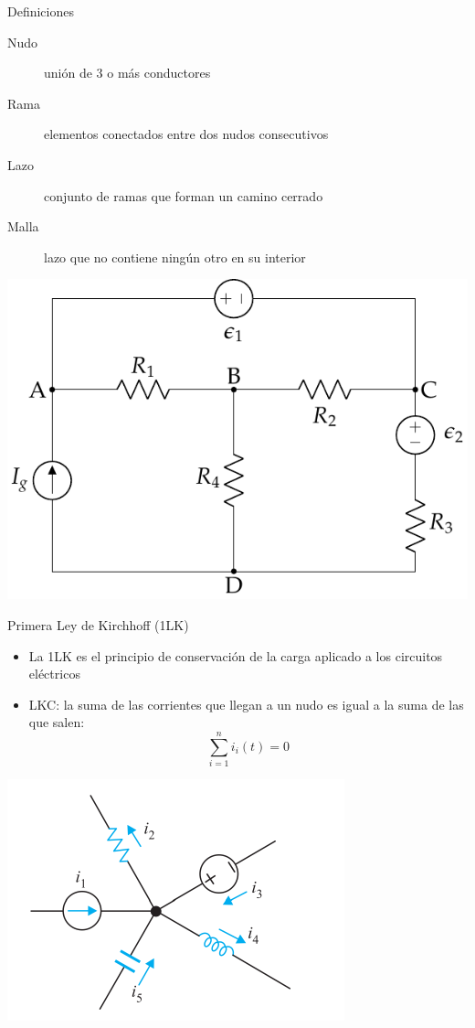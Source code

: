 \documentclass[aspectratio=169, xcolor={usenames,svgnames,dvipsnames}]{beamer}
\begin{document}
\begin{frame}{Definiciones}
\begin{description}
\item[{Nudo}] unión de \alert{3} o más conductores
\item[{Rama}] elementos conectados entre dos nudos consecutivos
\item[{Lazo}] conjunto de ramas que forman un camino cerrado
\item[{Malla}] lazo que no contiene ningún otro en su interior
\end{description}

\begin{center}
\includegraphics[height=0.5\textheight]{../figs/mallas.pdf}
\end{center}
\end{frame}

\begin{frame}{Primera Ley de Kirchhoff (1LK)}
\begin{itemize}
\item La \alert{1LK} es el principio de conservación de la carga aplicado a los circuitos eléctricos

\item \alert{LKC}: la suma de las corrientes que llegan a un nudo es igual a la suma de las que salen:
\begin{equation*}
			\boxed{\sum_{i=1}^n i_i(t)=0}
		\end{equation*}
\end{itemize}
\begin{center}
\includegraphics[height=0.4\textheight]{../figs/LKC_FM.pdf}
\end{center}
\end{frame}
\end{document}
